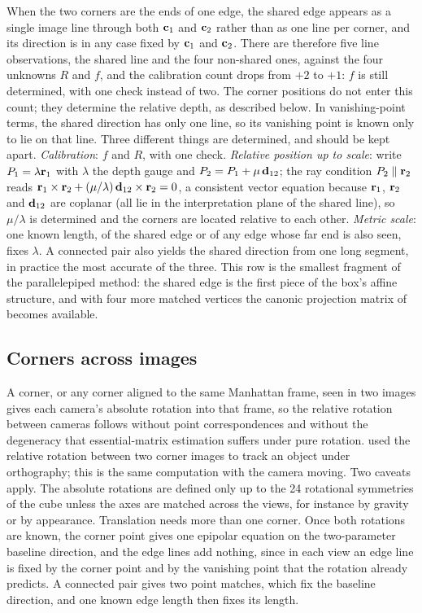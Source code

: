 When the two corners are the ends of one edge, the shared edge appears as a single image line through both $\mathbf{c}_1$ and $\mathbf{c}_2$ rather than as one line per corner, and its direction is in any case fixed by $\mathbf{c}_1$ and $\mathbf{c}_2$. There are therefore five line observations, the shared line and the four non-shared ones, against the four unknowns $R$ and $f$, and the calibration count drops from $+2$ to $+1$: $f$ is still determined, with one check instead of two. The corner positions do not enter this count; they determine the relative depth, as described below. In vanishing-point terms, the shared direction has only one line, so its vanishing point is known only to lie on that line. Three different things are determined, and should be kept apart. \emph{Calibration}: $f$ and $R$, with one check. \emph{Relative position up to scale}: write $P_1=\lambda\mathbf{r}_1$ with $\lambda$ the depth gauge and $P_2=P_1+\mu\,\mathbf{d}_{12}$; the ray condition $P_2\parallel\mathbf{r}_2$ reads $\mathbf{r}_1\times\mathbf{r}_2+(\mu/\lambda)\,\mathbf{d}_{12}\times\mathbf{r}_2=0$, a consistent vector equation because $\mathbf{r}_1$, $\mathbf{r}_2$ and $\mathbf{d}_{12}$ are coplanar (all lie in the interpretation plane of the shared line), so $\mu/\lambda$ is determined and the corners are located relative to each other. \emph{Metric scale}: one known length, of the shared edge or of any edge whose far end is also seen, fixes $\lambda$. A connected pair also yields the shared direction from one long segment, in practice the most accurate of the three. This row is the smallest fragment of the parallelepiped method: the shared edge is the first piece of the box's affine structure, and with four more matched vertices the canonic projection matrix of \citet{wilczkowiak2001} becomes available.

\subsection{Corners across images}\label{sec:multiview}

A corner, or any corner aligned to the same Manhattan frame, seen in two images gives each camera's absolute rotation into that frame, so the relative rotation between cameras follows without point correspondences and without the degeneracy that essential-matrix estimation suffers under pure rotation. \citet{kanatani1986} used the relative rotation between two corner images to track an object under orthography; this is the same computation with the camera moving. Two caveats apply. The absolute rotations are defined only up to the 24 rotational symmetries of the cube unless the axes are matched across the views, for instance by gravity or by appearance. Translation needs more than one corner. Once both rotations are known, the corner point gives one epipolar equation on the two-parameter baseline direction, and the edge lines add nothing, since in each view an edge line is fixed by the corner point and by the vanishing point that the rotation already predicts. A connected pair gives two point matches, which fix the baseline direction, and one known edge length then fixes its length.

